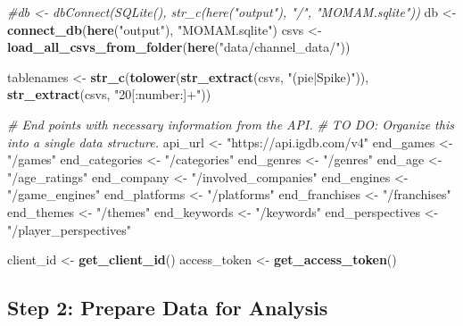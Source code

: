 \documentclass[
]{article}
\newenvironment{Shaded}{\begin{snugshade}}{\end{snugshade}}
\newcommand{\CommentTok}[1]{\textcolor[rgb]{0.56,0.35,0.01}{\textit{#1}}}
\newcommand{\FunctionTok}[1]{\textcolor[rgb]{0.13,0.29,0.53}{\textbf{#1}}}
\newcommand{\NormalTok}[1]{#1}
\newcommand{\OtherTok}[1]{\textcolor[rgb]{0.56,0.35,0.01}{#1}}
\newcommand{\StringTok}[1]{\textcolor[rgb]{0.31,0.60,0.02}{#1}}
\begin{document}
\begin{Shaded}
\begin{Highlighting}[]
\CommentTok{\#db \textless{}{-} dbConnect(SQLite(), str\_c(here("output"), "/", "MOMAM.sqlite"))}
\NormalTok{db }\OtherTok{\textless{}{-}} \FunctionTok{connect\_db}\NormalTok{(}\FunctionTok{here}\NormalTok{(}\StringTok{"output"}\NormalTok{), }\StringTok{"MOMAM.sqlite"}\NormalTok{)}
\NormalTok{csvs }\OtherTok{\textless{}{-}} \FunctionTok{load\_all\_csvs\_from\_folder}\NormalTok{(}\FunctionTok{here}\NormalTok{(}\StringTok{"data/channel\_data/"}\NormalTok{))}

\NormalTok{tablenames }\OtherTok{\textless{}{-}} \FunctionTok{str\_c}\NormalTok{(}\FunctionTok{tolower}\NormalTok{(}\FunctionTok{str\_extract}\NormalTok{(csvs, }\StringTok{"(pie|Spike)"}\NormalTok{)),}
                    \FunctionTok{str\_extract}\NormalTok{(csvs, }\StringTok{"20[:number:]+"}\NormalTok{))}


\CommentTok{\# End points with necessary information from the API.}
\CommentTok{\# TO DO: Organize this into a single data structure.}
\NormalTok{api\_url }\OtherTok{\textless{}{-}} \StringTok{"https://api.igdb.com/v4"}
\NormalTok{end\_games }\OtherTok{\textless{}{-}} \StringTok{"/games"}
\NormalTok{end\_categories }\OtherTok{\textless{}{-}} \StringTok{"/categories"}
\NormalTok{end\_genres }\OtherTok{\textless{}{-}} \StringTok{"/genres"}
\NormalTok{end\_age }\OtherTok{\textless{}{-}} \StringTok{"/age\_ratings"}
\NormalTok{end\_company }\OtherTok{\textless{}{-}} \StringTok{"/involved\_companies"}
\NormalTok{end\_engines }\OtherTok{\textless{}{-}} \StringTok{"/game\_engines"}
\NormalTok{end\_platforms }\OtherTok{\textless{}{-}} \StringTok{"/platforms"}
\NormalTok{end\_franchises }\OtherTok{\textless{}{-}} \StringTok{"/franchises"}
\NormalTok{end\_themes }\OtherTok{\textless{}{-}} \StringTok{"/themes"}
\NormalTok{end\_keywords }\OtherTok{\textless{}{-}} \StringTok{"/keywords"}
\NormalTok{end\_perspectives }\OtherTok{\textless{}{-}} \StringTok{"/player\_perspectives"}

\NormalTok{client\_id }\OtherTok{\textless{}{-}} \FunctionTok{get\_client\_id}\NormalTok{()}
\NormalTok{access\_token }\OtherTok{\textless{}{-}} \FunctionTok{get\_access\_token}\NormalTok{()}
\end{Highlighting}
\end{Shaded}

\hypertarget{step-2-prepare-data-for-analysis}{%
\subsection{Step 2: Prepare Data for
Analysis}\label{step-2-prepare-data-for-analysis}}
\end{document}

